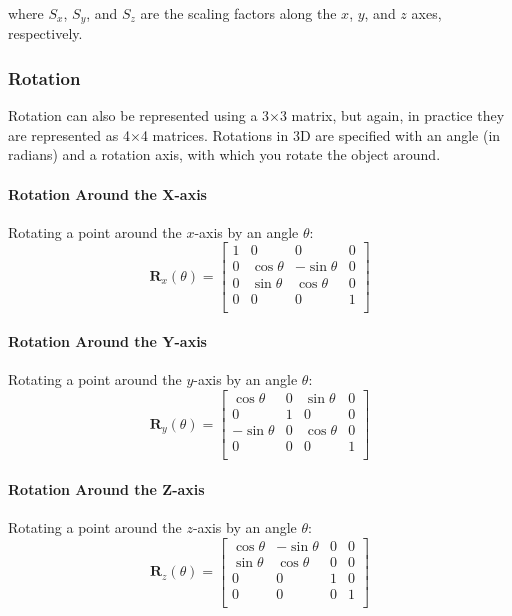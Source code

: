 \documentclass[12pt]{article}
\begin{document}
where \( S_x \), \( S_y \), and \( S_z \) are the scaling factors along the \( x \), \( y \), and \( z \) axes, respectively.

\subsubsection{Rotation}

Rotation can also be represented using a 3$\times$3 matrix, but again, in practice they are represented as 4$\times$4 matrices.
Rotations in 3D are specified with an angle (in radians) and a rotation axis, with which you rotate the object around.

\paragraph{Rotation Around the X-axis}

Rotating a point around the \(x\)-axis by an angle \(\theta\):
\[
    \mathbf{R}_x(\theta) = \begin{bmatrix}
        1 & 0           & 0            & 0 \\
        0 & \cos \theta & -\sin \theta & 0 \\
        0 & \sin \theta & \cos \theta  & 0 \\
        0 & 0           & 0            & 1 \\
    \end{bmatrix}
\]

\paragraph{Rotation Around the Y-axis}
Rotating a point around the \(y\)-axis by an angle \(\theta\):
\[
    \mathbf{R}_y(\theta) = \begin{bmatrix}
        \cos \theta  & 0 & \sin \theta & 0 \\
        0            & 1 & 0           & 0 \\
        -\sin \theta & 0 & \cos \theta & 0 \\
        0            & 0 & 0           & 1 \\
    \end{bmatrix}
\]

\paragraph{Rotation Around the Z-axis}

Rotating a point around the \(z\)-axis by an angle \(\theta\):
\[
    \mathbf{R}_z(\theta) = \begin{bmatrix}
        \cos \theta & -\sin \theta & 0 & 0 \\
        \sin \theta & \cos \theta  & 0 & 0 \\
        0           & 0            & 1 & 0 \\
        0           & 0            & 0 & 1 \\
    \end{bmatrix}
\]
\end{document}
